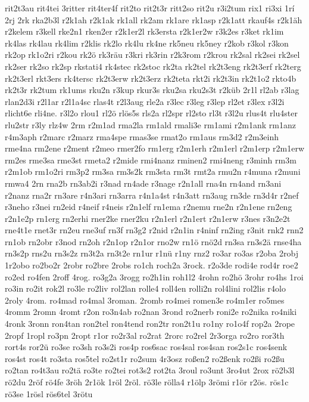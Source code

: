 {rit2t3au
rit4tei
3ritter
rit4ter4f
rit2to
rit2t3r
ritt2so
rit2u
r3i2tum
rix1
ri3xi
1rí
2rj
2rk
rka2b3l
r2k1ah
r2k1ak
rk1all
rk2am
rk1are
rk1asp
r2k1att
rkauf4s
r2k1äh
r2kelem
r3kell
rke2n1
rken2er
r2k1er2l
rk3ersta
r2k1er2w
r3k2es
r3ket
rk1im
rk4las
rk4lau
rk4lim
r2klis
rk2lo
rk4lu
rk4ne
rk5neu
rk5ney
r2kob
r3kol
r3kon
rk2op
rk1o2ri
r2kou
rk2ö
rk3räu
r3kri
rk3rin
r2k3rom
r2krou
rk2sal
rk2sei
rk2sel
rk2ser
rk2so
rk2sp
rkstati4
rk4stec
rk2stoc
rk2ta
rk2tel
rk2t3eng
rk2t3erf
rk2terg
rk2t3erl
rkt3ers
rk4tersc
rk2t3erw
rk2t3erz
rk2teta
rkt2i
rk2t3in
rk2t1o2
rkto4b
rk2t3r
rk2tum
rk1ums
rku2n
r3kup
rkur3s
rku2sa
rku2s3t
r2küb
2r1l
rl2ab
r3lag
rlan2d3i
r2l1ar
r2l1a4sc
rlas4t
r2l3aug
rle2a
r3lec
r3leg
r3lep
rl2et
r3lex
r3l2i
rlicht6e
rli4ne.
r3l2o
rlou1
rl2ö
rlös5s
rls2a
rl2spr
rl2sto
rl3t
r3l2u
rlus4t
rlu4ster
rlu2str
r3ly
rlz4w
2rm
r2m1ad
rma2la
rm1ald
rmali3e
rm1ami
r2m1ank
rm1anz
r4m3aph
r2marc
r2marz
rma4spe
rmas3se
rmat2o
rm1aus
rm3d2
r2m3einh
rme4na
rm2ene
r2ment
r2meo
rmer2fo
rm1erg
r2m1erh
r2m1erl
r2m1erp
r2m1erw
rm2es
rme3sa
rme3st
rmeta2
r2mide
rmi4nanz
rminen2
rmi4neng
r3minh
rm3m
r2m1ob
rm1o2ri
rm3p2
rm3sa
rm3s2k
rm3sta
rm3t
rmt2a
rmu2n
r4muna
r2muni
rmwa4
2rn
rna2b
rn3ab2i
r3nad
rn4ade
r3nage
r2n1all
rna4n
rn4and
rn3ani
r2nanz
rna2r
rn3are
r4n3ari
rn3arra
r4n1a4st
r4n3att
rn3aug
rn3de
rn3d4r
r2nef
r3neho
r3nei
rn2eid
r4neif
r4neis
r2n1elf
rn1ema
r2nemu
rne2n
r2n1ene
rn2eng
r2n1e2p
rn1erg
rn2erhi
rner2ke
rner2ku
r2n1erl
r2n1ert
r2n1erw
r3nes
r3n2e2t
rne4t1e
rnet3r
rn2eu
rne3uf
rn3f
rn3g2
r2nid
r2n1in
r4ninf
rn2ing
r3nit
rnk2
rnn2
rn1ob
rn2obr
r3nod
rn2oh
r2n1op
r2n1or
rno2w
rn1ö
rnö2d
rn3sa
rn3s2ä
rnse4ha
rn3s2p
rns2u
rn3s2z
rn3t2a
rn3t2e
rn1ur
r1nü
r1ny
rnz2
ro3ar
ro3as
r2oba
2robj
1r2obo
ro2bo2r
2robr
ro2bre
2robs
ro1ch
roch2a
3rock.
r2o3de
rodi4e
rod4r
roe2
ro2ed
ro4fen
2roff
4rog.
ro3g2a
3rogg
ro2h1in
roh1l2
4rohn
ro2hö
3rohr
ro4hs
1roi
ro3in
ro2it
rok2l
ro3le
ro2liv
rol2lan
rolle4
roll4en
rolli2n
rol4lini
rol2lis
r4olo
2roly
4rom.
ro4mad
ro4mal
3roman.
2romb
ro4mei
romen3e
ro4m1er
ro5mes
4romm
2romn
4romt
r2on
ro3n4ab
ro2nan
3rond
ro2nerb
roni2e
ro2nika
ro4niki
4ronk
3ronn
ron4tan
ron2tel
ron4tend
ron2tr
ron2t1u
ro1ny
ro1o4f
rop2a
2rope
2ropf
1ropl
ro3pn
2ropt
r1or
ro2r3al
ro2rat
2rorc
ro2rel
2r3orga
ro2ro
ror3th
rort4s
ror2ü
ro3se
ro3sh
ro3s2i
ros4p
ros6sac
ros4sal
ros4san
ros2s1c
ros4senk
ros4st
ros4t
ro3sta
ros5tel
ro2st1r
ro2sum
4r3osz
roßen2
ro2ßenk
ro2ßi
ro2ßu
ro2tan
ro4t3au
ro2tä
ro3te
ro2tei
rot3s2
rot2ta
3roul
ro3unt
3ro4ut
2rox
rö2b3l
rö2du
2röf
rö4fe
3röh
2r1ök
1röl
2röl.
rö3le
rölla4
r1ölp
3römi
r1ör
r2ös.
rös1c
rö3se
1rösl
rös6tel
3rötu
}
